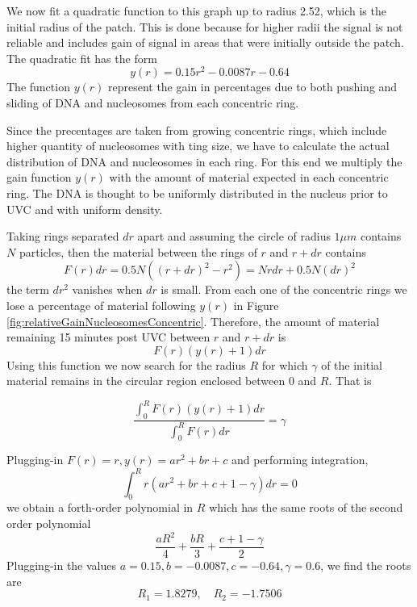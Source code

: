 \documentclass[12pt]{report}
\begin{document}
We now fit a quadratic function to this graph up to radius 2.52, which is the initial radius of the patch. This is done because for higher radii the signal is not reliable and includes gain of signal in areas that were initially outside the patch. The quadratic fit has the form 
\begin{equation*}
y(r)=0.15r^2-0.0087r-0.64
\end{equation*}
The function $y(r)$ represent the gain in percentages due to both pushing and sliding of DNA and nucleosomes from each concentric ring. 

Since the precentages are taken from growing concentric rings, which include higher quantity of nucleosomes with ting size, we have to calculate the actual distribution of DNA and nucleosomes in each ring. For this end we multiply the gain function $y(r)$ with the amount of material expected in each concentric ring. The DNA is thought to be uniformly distributed in the nucleus prior to UVC and with uniform density. 

Taking rings separated  $dr$ apart and assuming the circle of radius  $1 \mu m$ contains $N$ particles, then the material between the rings of $r$ and $r+dr$ contains  
\begin{equation*}
F(r)dr = 0.5N\left((r+dr)^2- r^2\right)=Nrdr+0.5N(dr)^2
\end{equation*}
the term $dr ^2$ vanishes when $dr$ is small.
From each one of the concentric rings we lose a percentage of material following $y(r)$ in Figure \ref{fig:relativeGainNucleosomesConcentric}. Therefore, the amount of material remaining 15 minutes post UVC between $r$ and $r+dr$ is
\begin{equation*}
F(r)(y(r)+1)dr
\end{equation*}
Using this function we now search for the radius $R$ for which $\gamma$ of the initial material remains in the circular region enclosed between 0 and $R$. That is 

\begin{equation*}
\frac{\int_0^RF(r)(y(r)+1)dr}{\int_0^RF(r)dr} =\gamma
\end{equation*} 

Plugging-in  $F(r)=r,y(r)=ar^2 +br +c$ and performing integration, 
\begin{equation*}
\int_0^R r(ar^2 +br+c +1-\gamma)dr =0
\end{equation*}
we obtain a forth-order polynomial in $R$ which has the same roots of the second order polynomial 
\begin{equation*}
\frac{aR^2}{4} +\frac{bR}{3} +\frac{c+1-\gamma}{2}
\end{equation*}
Plugging-in the values $a=0.15, b=-0.0087,c=-0.64, \gamma=0.6$, we find the roots are 
\begin{equation*}
R_1=1.8279, \quad R_2= -1.7506
\end{equation*}
\end{document}
